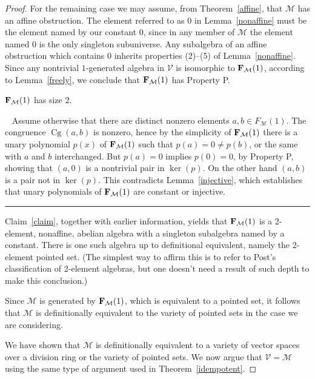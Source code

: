 \begin{proof}
For the remaining case we may assume, from Theorem~\ref{affine},
that $\mathcal M$ has
an affine obstruction. The element referred to as
$0$ in Lemma~\ref{nonaffine} 
must be the element named by our constant $0$, since
in any member of $\mathcal M$ the element named $0$ is the only
singleton subuniverse. Any subalgebra of an affine obstruction
which contains $0$ inherits properties (2)--(5)
of Lemma~\ref{nonaffine}. Since
any nontrivial $1$-generated algebra in $\mathcal V$ is isomorphic
to ${{\mathbf{\uppercase{f}}}}_{\mathcal M}(1)$, according to Lemma~\ref{freely},
we conclude that ${{\mathbf{\uppercase{f}}}}_{\mathcal M}(1)$ has Property P.

\begin{clm}\label{claim}
${{\mathbf{\uppercase{f}}}}_{\mathcal M}(1)$ has size $2$.
  \end{clm}

{\ }
Assume otherwise that there are distinct nonzero
elements $a, b\in F_{\mathcal M}(1)$. The congruence
$\operatorname{Cg}(a,b)$ is nonzero, hence by the simplicity of
${{\mathbf{\uppercase{f}}}}_{\mathcal M}(1)$
there is a unary polynomial $p(x)$
of ${{\mathbf{\uppercase{f}}}}_{\mathcal M}(1)$ such that $p(a)=0\neq p(b)$, or the same
with $a$ and $b$ interchanged. But $p(a)=0$ implies
$p(0)=0$, by Property P, showing that $(a,0)$
is a nontrivial pair in $\ker(p)$. On the other hand
$(a,b)$ is a pair not in $\ker(p)$. This contradicts
Lemma~\ref{injective}, which establishes that unary polynomials
of ${{\mathbf{\uppercase{f}}}}_{\mathcal M}(1)$ are constant or injective.
  {\hfill\rule{1.3mm}{3mm}}

  \bigskip
  
  Claim~\ref{claim}, together with earlier information, yields that
  ${{\mathbf{\uppercase{f}}}}_{\mathcal M}(1)$ is a 2-element, nonaffine, abelian
  algebra with a singleton subalgebra named by a constant.
  There is one such algebra up to definitional equivalent,
  namely the 2-element pointed set. (The simplest way to affirm this
  is to refer to Post's classification of 2-element algebras,
  but one doesn't need a result of such depth to make this conclusion.)

  Since $\mathcal M$ is generated by ${{\mathbf{\uppercase{f}}}}_{\mathcal M}(1)$, which
  is equivalent to a pointed set, it follows that ${\mathcal M}$
  is definitionally equivalent to the variety of pointed sets
  in the case we are considering.

  We have shown that $\mathcal M$ is definitionally equivalent
  to a variety of vector spaces over a division ring or the variety
  of pointed sets. 
  We now argue that ${\mathcal V}={\mathcal M}$ using the same type
  of argument used in Theorem~\ref{idempotent}.


\end{proof}
